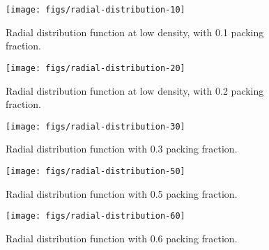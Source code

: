 \documentclass[letterpaper,twocolumn,amsmath,amssymb,prb]{revtex4-1}
\begin{document}
\begin{figure}
\begin{center}
\texttt{[image: figs/radial-distribution-10]}
\end{center}
\caption{Radial distribution function at low density, with 0.1 packing
  fraction.}
\label{fig:radial-distribution-10}
\end{figure}

\begin{figure}
\begin{center}
\texttt{[image: figs/radial-distribution-20]}
\end{center}
\caption{Radial distribution function at low density, with 0.2 packing
  fraction.}
\label{fig:radial-distribution-20}
\end{figure}

\begin{figure}
\begin{center}
\texttt{[image: figs/radial-distribution-30]}
\end{center}
\caption{Radial distribution function with 0.3 packing
  fraction.}
\label{fig:radial-distribution-30}
\end{figure}

\begin{figure}
\begin{center}
\texttt{[image: figs/radial-distribution-50]}
\end{center}
\caption{Radial distribution function with 0.5 packing
  fraction.}
\label{fig:radial-distribution-50}
\end{figure}

\begin{figure}
\begin{center}
\texttt{[image: figs/radial-distribution-60]}
\end{center}
\caption{Radial distribution function with 0.6 packing
  fraction.}
\label{fig:radial-distribution-60}
\end{figure}


\end{document}
